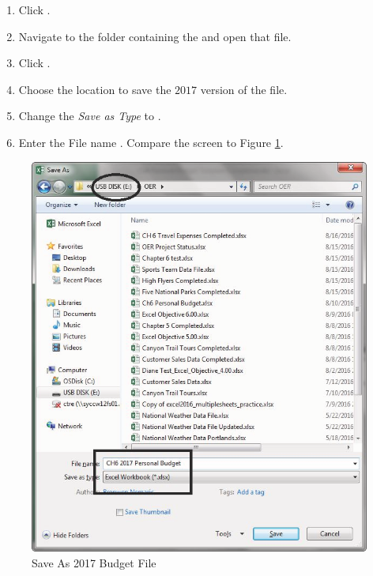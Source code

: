 \begin{enumerate}
	\item Click .
	\item Navigate to the folder containing the  and open that file.
	\item Click .
	\item Choose the location to save the $ 2017 $ version of the file.
	\item Change the \textit{Save as Type} to .
	\item Enter the File name . Compare the screen to Figure \ref{06:fig12}.
\end{enumerate}

\begin{figure}[H]
	\centering
	\includegraphics[width=\maxwidth{.95\linewidth}]{gfx/ch06_fig12}
	\caption{Save As 2017 Budget File}
	\label{06:fig12}
\end{figure}

